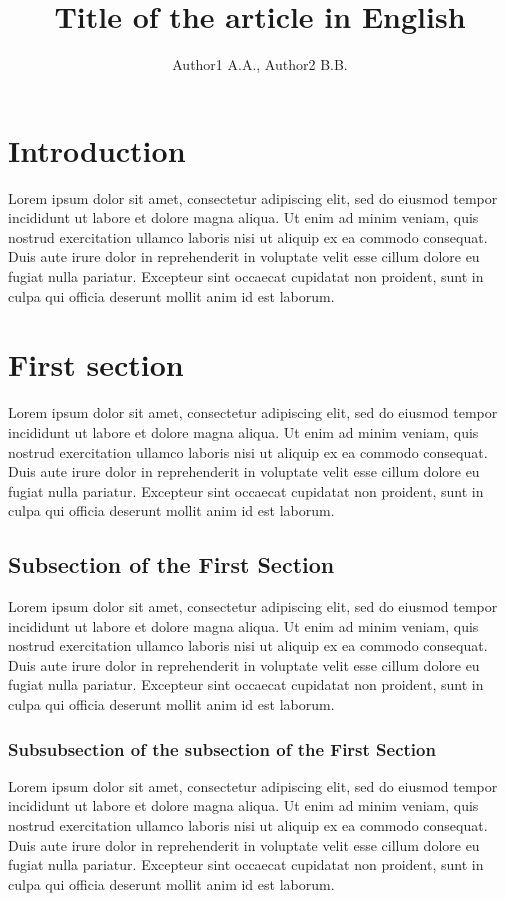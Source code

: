 \documentclass[12pt,twoside,draft]{cmpart}
\author{Author1 A.A., Author2 B.B.}
\title{Title of the article in English}
\institute{Univeristy, Address, City, Country (Author1 A.A.)\\
Univeristy, Address, City, Country (Author2 B.B.)}
\begin{document}
\maketitle


\section*{Introduction}
Lorem ipsum dolor sit amet, consectetur adipiscing elit, sed do eiusmod tempor 
incididunt ut labore et dolore magna aliqua. Ut enim ad minim veniam, 
quis nostrud exercitation ullamco laboris nisi ut aliquip ex ea commodo consequat. 
Duis aute irure dolor in reprehenderit in voluptate velit esse cillum dolore eu fugiat nulla pariatur. 
Excepteur sint occaecat cupidatat non proident, sunt in culpa qui officia deserunt mollit anim id est laborum.

\section{First section}
Lorem ipsum dolor sit amet, consectetur adipiscing elit, sed do eiusmod tempor 
incididunt ut labore et dolore magna aliqua. Ut enim ad minim veniam, 
quis nostrud exercitation ullamco laboris nisi ut aliquip ex ea commodo consequat. 
Duis aute irure dolor in reprehenderit in voluptate velit esse cillum dolore eu fugiat nulla pariatur. 
Excepteur sint occaecat cupidatat non proident, sunt in culpa qui officia deserunt mollit anim id est laborum.

\subsection{Subsection of the First Section}
Lorem ipsum dolor sit amet, consectetur adipiscing elit, sed do eiusmod tempor 
incididunt ut labore et dolore magna aliqua. Ut enim ad minim veniam, 
quis nostrud exercitation ullamco laboris nisi ut aliquip ex ea commodo consequat. 
Duis aute irure dolor in reprehenderit in voluptate velit esse cillum dolore eu fugiat nulla pariatur. 
Excepteur sint occaecat cupidatat non proident, sunt in culpa qui officia deserunt mollit anim id est laborum.

\subsubsection{Subsubsection of the subsection of the First Section}
Lorem ipsum dolor sit amet, consectetur adipiscing elit, sed do eiusmod tempor 
incididunt ut labore et dolore magna aliqua. Ut enim ad minim veniam, 
quis nostrud exercitation ullamco laboris nisi ut aliquip ex ea commodo consequat. 
Duis aute irure dolor in reprehenderit in voluptate velit esse cillum dolore eu fugiat nulla pariatur. 
Excepteur sint occaecat cupidatat non proident, sunt in culpa qui officia deserunt mollit anim id est laborum.
\end{document}
